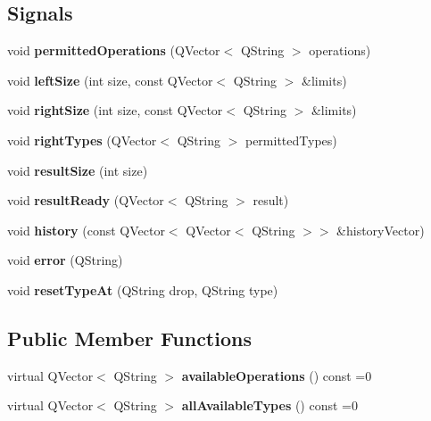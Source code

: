 \subsection*{Signals}
\begin{DoxyCompactItemize}
\item 
\mbox{\label{class_model_a636cd0b310ee32bd0d7f4a158cb56b6d}} 
void {\bfseries permitted\+Operations} (Q\+Vector$<$ Q\+String $>$ operations)
\item 
\mbox{\label{class_model_a533d6dc0f4b7ed4d49f308b689a7747f}} 
void {\bfseries left\+Size} (int size, const Q\+Vector$<$ Q\+String $>$ \&limits)
\item 
\mbox{\label{class_model_a640b1f4da464ee848601f9122dab5bc4}} 
void {\bfseries right\+Size} (int size, const Q\+Vector$<$ Q\+String $>$ \&limits)
\item 
\mbox{\label{class_model_a4019e969fe2996f955d07852f10693dd}} 
void {\bfseries right\+Types} (Q\+Vector$<$ Q\+String $>$ permitted\+Types)
\item 
\mbox{\label{class_model_a80434fb1d9e3abe82df328164a894e2f}} 
void {\bfseries result\+Size} (int size)
\item 
\mbox{\label{class_model_ae794cf24374d3c78f1b49731d096a077}} 
void {\bfseries result\+Ready} (Q\+Vector$<$ Q\+String $>$ result)
\item 
\mbox{\label{class_model_a084ed959b9dbdac8f33047916a2b1e9e}} 
void {\bfseries history} (const Q\+Vector$<$ Q\+Vector$<$ Q\+String $>$$>$ \&history\+Vector)
\item 
\mbox{\label{class_model_a1bef8f3d9f6d483c016e3b8d30ea6025}} 
void {\bfseries error} (Q\+String)
\item 
\mbox{\label{class_model_aa06479997ae88278ab636dc302e1fb70}} 
void {\bfseries reset\+Type\+At} (Q\+String drop, Q\+String type)
\end{DoxyCompactItemize}
\subsection*{Public Member Functions}
\begin{DoxyCompactItemize}
\item 
\mbox{\label{class_model_a2e34231c9285a6c0a3e3f0c5cd4d51aa}} 
virtual Q\+Vector$<$ Q\+String $>$ {\bfseries available\+Operations} () const =0
\item 
\mbox{\label{class_model_ad8efaa1708d2179e4a8e1474cae2df1d}} 
virtual Q\+Vector$<$ Q\+String $>$ {\bfseries all\+Available\+Types} () const =0
\end{DoxyCompactItemize}


